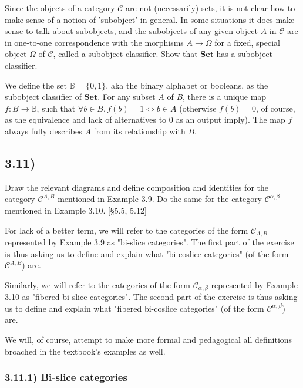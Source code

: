 \documentclass[12pt, letterpaper, twoside]{report}
\begin{document}
Since the objects of a category $\mathcal{C}$ are not (necessarily) sets, it is not clear how to make sense of a notion of 'subobject' in general. In some situations it does make sense to talk about subobjects, and the subobjects of any given object $A$ in $\mathcal{C}$ are in one-to-one correspondence with the morphisms $A \to \Omega$ for a fixed, special object $\Omega$ of $\mathcal{C}$, called a subobject classifier. Show that $\mathbf{Set}$ has a subobject classifier.

We define the set $\mathbb{B} = \{ 0, 1 \}$, aka the binary alphabet or booleans, as the subobject classifier of $\mathbf{Set}$. For any subset $A$ of $B$, there is a unique map $f: B \to \mathbb{B}$, such that $\forall b \in B, f(b) = 1 \Leftrightarrow b \in A$ (otherwise $f(b) = 0$, of course, as the equivalence and lack of alternatives to $0$ as an output imply). The map $f$ always fully describes $A$ from its relationship with $B$.



\subsection*{3.11)}

Draw the relevant diagrams and define composition and identities for the category $\mathcal{C}^{A,B}$ mentioned in Example 3.9. Do the same for the category $\mathcal{C}^{\alpha, \beta}$ mentioned in Example 3.10. [§5.5, 5.12]

For lack of a better term, we will refer to the categories of the form $\mathcal{C}_{A,B}$ represented by Example 3.9 as "bi-slice categories". The first part of the exercise is thus asking us to define and explain what "bi-coslice categories" (of the form $\mathcal{C}^{A,B}$) are.

Similarly, we will refer to the categories of the form $\mathcal{C}_{\alpha, \beta}$ represented by Example 3.10 as "fibered bi-slice categories". The second part of the exercise is thus asking us to define and explain what "fibered bi-coslice categories" (of the form $\mathcal{C}^{\alpha, \beta}$) are.

We will, of course, attempt to make more formal and pedagogical all definitions broached in the textbook's examples as well.


\subsubsection*{3.11.1) Bi-slice categories}
\end{document}
